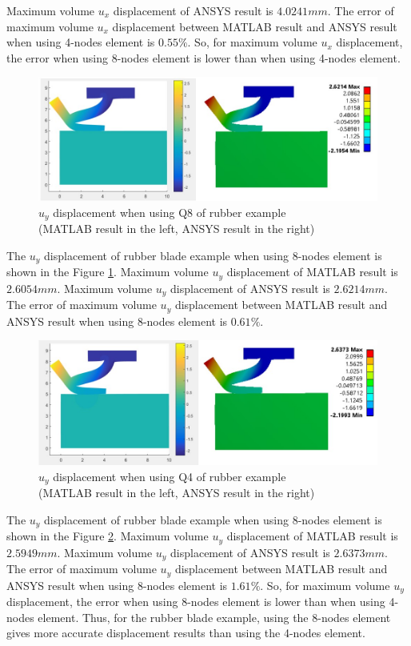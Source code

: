 Maximum volume $u_x$ displacement of ANSYS result is $4.0241 mm$.
The error of maximum volume $u_x$ displacement between MATLAB result and ANSYS result when using 4-nodes element is $0.55\%$.
So, for maximum volume $u_x$ displacement, the error when using 8-nodes element is lower than when using 4-nodes element.
\newpage
\begin{figure}[H]
    \centering
    \includegraphics[scale=0.65]{Figures/chapter5/r_q8_uy.jpg}
    \decoRule
    \caption{$u_y$ displacement when using Q8 of rubber example \\
    (MATLAB result in the left, ANSYS result in the right)}
    \label{fig:r_q8_uy}
\end{figure}
\noindent
The $u_y$ displacement of rubber blade example when using 8-nodes element is shown in the Figure \ref{fig:r_q8_uy}.
Maximum volume $u_y$ displacement of MATLAB result is $2.6054 mm$.
Maximum volume $u_y$ displacement of ANSYS result is $2.6214 mm$.
The error of maximum volume $u_y$ displacement between MATLAB result and ANSYS result when using 8-nodes element is $0.61\%$.
\newline
\begin{figure}[H]
    \centering
    \includegraphics[scale=0.66]{Figures/chapter5/r_q4_uy.jpg}
    \decoRule
    \caption{$u_y$ displacement when using Q4 of rubber example \\
    (MATLAB result in the left, ANSYS result in the right)}
    \label{fig:r_q4_uy}
\end{figure}
\noindent
The $u_y$ displacement of rubber blade example when using 8-nodes element is shown in the Figure \ref{fig:r_q4_uy}.
Maximum volume $u_y$ displacement of MATLAB result is $2.5949 mm$.
Maximum volume $u_y$ displacement of ANSYS result is $2.6373 mm$.
The error of maximum volume $u_y$ displacement between MATLAB result and ANSYS result when using 8-nodes element is $1.61\%$.
So, for maximum volume $u_y$ displacement, the error when using 8-nodes element is lower than when using 4-nodes element.
\vspace{0.38cm}
\newline
Thus, for the rubber blade example, using the 8-nodes element gives more accurate displacement results than using the 4-nodes element.
\newpage
